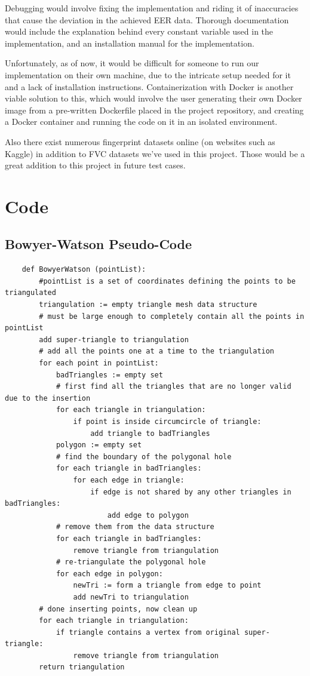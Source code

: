 \documentclass[fyp]{socreport}
\begin{document}
Debugging would involve fixing the implementation and riding it of inaccuracies that cause the deviation in the achieved EER data. Thorough documentation would include the explanation behind every constant variable used in the implementation, and an installation manual for the implementation.

Unfortunately, as of now, it would be difficult for someone to run our implementation on their own machine, due to the intricate setup needed for it and a lack of installation instructions. Containerization with Docker is another viable solution to this, which would involve the user generating their own Docker image from a pre-written Dockerfile placed in the project repository, and creating a Docker container and running the code on it in an isolated environment.

Also there exist numerous fingerprint datasets online (on websites such as Kaggle) in addition to FVC datasets we've used in this project. Those would be a great addition to this project in future test cases.




\appendix
\chapter{Code}
\section{Bowyer-Watson Pseudo-Code}
\label{code:a1}
\begin{lstlisting}
	def BowyerWatson (pointList):
		#pointList is a set of coordinates defining the points to be triangulated
		triangulation := empty triangle mesh data structure
		# must be large enough to completely contain all the points in pointList
		add super-triangle to triangulation 
		# add all the points one at a time to the triangulation
		for each point in pointList: 
			badTriangles := empty set
			# first find all the triangles that are no longer valid due to the insertion
			for each triangle in triangulation: 
				if point is inside circumcircle of triangle:
					add triangle to badTriangles
			polygon := empty set
			# find the boundary of the polygonal hole
			for each triangle in badTriangles: 
				for each edge in triangle:
					if edge is not shared by any other triangles in badTriangles:
						add edge to polygon
			# remove them from the data structure
			for each triangle in badTriangles:
				remove triangle from triangulation
			# re-triangulate the polygonal hole
			for each edge in polygon:
				newTri := form a triangle from edge to point
				add newTri to triangulation
		# done inserting points, now clean up
		for each triangle in triangulation:
			if triangle contains a vertex from original super-triangle:
				remove triangle from triangulation
		return triangulation
\end{lstlisting}
\end{document}

